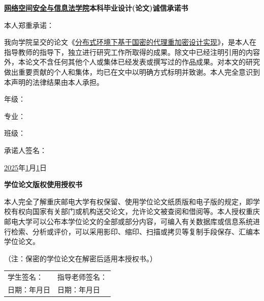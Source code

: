 \begin{center}
  \textbf{\underline{网络空间安全与信息法学院}本科毕业设计(论文)诚信承诺书}
\end{center}

本人郑重承诺：

我向学院呈交的论文《\underline{分布式环境下基于国密的代理重加密设计实现}》，是本人在指导教师的指导下，独立进行研究工作所取得的成果。除文中已经注明引用的内容外，本论文不含任何其他个人或集体已经发表或撰写过的作品成果。对本文的研究做出重要贡献的个人和集体，均已在文中以明确方式标明并致谢。本人完全意识到本声明的法律结果由本人承担。


\vspace{1cm}
\begin{flushright}
年级：\underline{\makebox[3cm]{\hfill 2021\hfill}}\par
专业：\underline{}\par
班级：\underline{\makebox[3cm]{\hfill 40402101\hfill}}\par
承诺人签名：\underline{}\par
\vspace{0.3cm}
\underline{2025}年\underline{1}月\underline{1}日
\end{flushright}
\vspace{1cm}
\begin{center}
\textbf{学位论文版权使用授权书}
\end{center}

本人完全了解重庆邮电大学有权保留、使用学位论文纸质版和电子版的规定，即学校有权向国家有关部门或机构送交论文，允许论文被查阅和借阅等。本人授权重庆邮电大学可以公布本学位论文的全部或部分内容，可编入有关数据库或信息系统进行检索、分析或评价，可以采用影印、缩印、扫描或拷贝等复制手段保存、汇编本学位论文。

（注：保密的学位论文在解密后适用本授权书。）

\vspace{1cm}
\noindent
\begin{tabular}{ll}
学生签名：\underline{\hspace{3cm}} & 指导老师签名：\underline{\hspace{3cm}}\\[0.5cm]
日期：\underline{\hspace{1cm}}年\underline{\hspace{1cm}}月\underline{\hspace{1cm}}日 & 
日期：\underline{\hspace{1cm}}年\underline{\hspace{1cm}}月\underline{\hspace{1cm}}日
\end{tabular}


